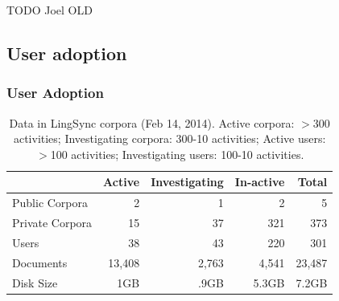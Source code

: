 \documentclass{beamer}
\begin{document}
\begin{frame}
TODO Joel OLD
\end{frame}


\subsection{User adoption}

\begin{frame}
\frametitle{User Adoption}
\begin{table}[h]
\begin{center}
\scriptsize
\begin{tabular}{lrrrr}
      \toprule
                     ~ &  Active & Investigating & In-active & Total\\
      \midrule
      Public Corpora  &       2 &   1 &   2 & 5 \\ 
      Private Corpora &      15 &  37 & 321 & 373\\ 
      Users           &      38 &  43 & 220 & 301 \\
      Documents & 13,408 & 2,763 & 4,541 &23,487\\
      Disk Size & 1GB & .9GB & 5.3GB& 7.2GB\\
      
      \bottomrule

\end{tabular}
\caption{Data in LingSync corpora (Feb 14, 2014). Active corpora: $>$300
activities; Investigating corpora: 300-10 activities; Active users: $>$100
activities; Investigating users: 100-10 activities.}
\label{lingsync-data}
 \end{center}
 \normalsize
\end{table}

\end{frame}
\end{document}
